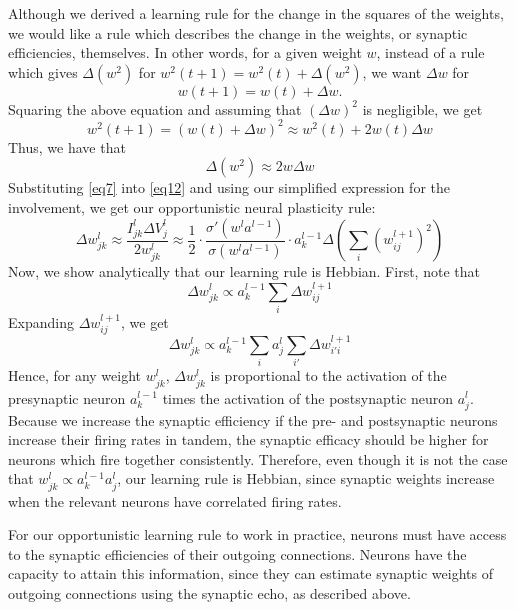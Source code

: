 \documentclass[12pt]{article}
\begin{document}
Although we derived a learning rule for the change in the squares of the weights, we would like a rule which describes the change in the weights, or synaptic efficiencies, themselves. In other words, for a given weight $w$, instead of a rule which gives $\Delta(w^2)$ for $w^2(t+1) = w^2(t) + \Delta(w^2)$, we want $\Delta w$ for
\begin{equation}
	w(t+1) = w(t) + \Delta w.
\end{equation}
Squaring the above equation and assuming that $(\Delta w)^2$ is negligible, we get
\begin{equation}
	w^2(t+1) = (w(t) + \Delta w)^2 \approx w^2(t) + 2w(t)\Delta w
\end{equation}
Thus, we have that
\begin{equation}
	\Delta (w^2) \approx 2w\Delta w\label{eq12}
\end{equation}
Substituting \ref{eq7} into \ref{eq12} and using our simplified expression for the involvement, we get our opportunistic neural plasticity rule:
\begin{equation}
	\Delta w_{jk}^l\approx \frac{I_{jk}^l \Delta V_j^l}{2w_{jk}^l}\approx\frac{1}{2}\cdot\frac{\sigma'\left(w^l a^{l-1}\right)}{\sigma\left(w^l a^{l-1}\right)}\cdot a_k^{l-1}\Delta \left(\sum_i \left(w_{ij}^{l+1}\right)^2\right)\label{eq13}
\end{equation}
Now, we show analytically that our learning rule is Hebbian. First, note that
\begin{equation}
	\Delta w_{jk}^l\propto a_k^{l-1}\sum_i \Delta w_{ij}^{l+1}
\end{equation}
Expanding $\Delta w_{ij}^{l+1}$, we get
\begin{equation}
	\Delta w_{jk}^l\propto a_k^{l-1}\sum_i a_j^l \sum_{i'} \Delta w_{i'i}^{l+1}
\end{equation}
Hence, for any weight $w_{jk}^l$, $\Delta w_{jk}^l$ is proportional to the activation of the presynaptic neuron $a_k^{l-1}$ times the activation of the postsynaptic neuron $a_j^l$. Because we increase the synaptic efficiency if the pre- and postsynaptic neurons increase their firing rates in tandem, the synaptic efficacy should be higher for neurons which fire together consistently. Therefore, even though it is not the case that $w_{jk}^l\propto a_k^{l-1}a_j^l$, our learning rule is Hebbian, since synaptic weights increase when the relevant neurons have correlated firing rates.

For our opportunistic learning rule to work in practice, neurons must have access to the synaptic efficiencies of their outgoing connections. Neurons have the capacity to attain this information, since they can estimate synaptic weights of outgoing connections using the synaptic echo, as described above.
\end{document}
